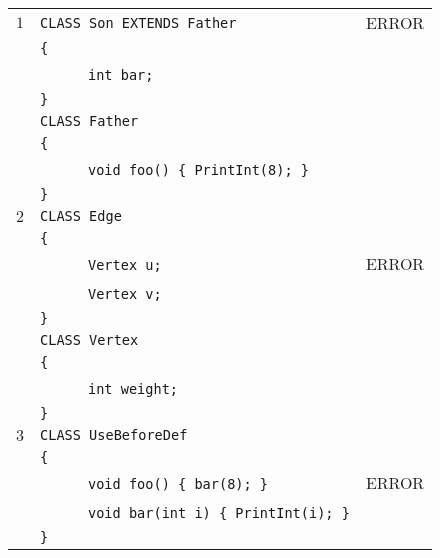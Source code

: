\documentclass{article}
\begin{document}
\begin{table}[h]
\centering
\begin{tabular}{|l|l|l|}
\hline
 $1$ & \verb"CLASS Son EXTENDS Father"           & ERROR \\
     & \verb"{"                                  &       \\
     & ~ ~ ~ ~\verb"int bar;"                    &       \\
     & \verb"}"                                  &       \\
     & \verb"CLASS Father"                       &       \\
     & \verb"{"                                  &       \\
     & ~ ~ ~ ~\verb"void foo() { PrintInt(8); }" &       \\
     & \verb"}"                                  &       \\
\hline
 $2$ & \verb"CLASS Edge"                         &       \\
     & \verb"{"                                  &       \\
     & ~ ~ ~ ~\verb"Vertex u;"                   & ERROR \\
     & ~ ~ ~ ~\verb"Vertex v;"                   &       \\
     & \verb"}"                                  &       \\
     & \verb"CLASS Vertex"                       &       \\
     & \verb"{"                                  &       \\
     & ~ ~ ~ ~\verb"int weight;"                 &       \\
     & \verb"}"                                  &       \\
\hline
 $3$ & \verb"CLASS UseBeforeDef"                      &    \\
     & \verb"{"                                       &    \\
     & ~ ~ ~ ~\verb"void foo() { bar(8); }"           & ERROR \\
     & ~ ~ ~ ~\verb"void bar(int i) { PrintInt(i); }" &    \\
     & \verb"}"                                       &    \\

\end{tabular}
\end{table}
\end{document}
